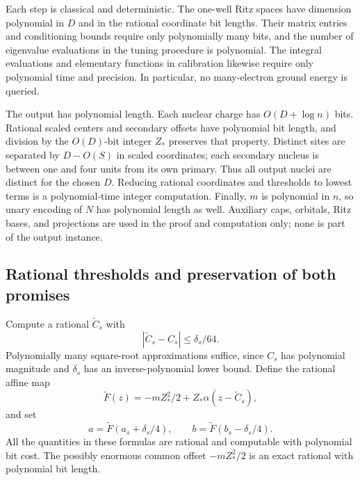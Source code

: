 Each step is classical and deterministic. The one-well Ritz spaces have dimension polynomial in $D$ and in the rational coordinate bit lengths. Their matrix entries and conditioning bounds require only polynomially many bits, and the number of eigenvalue evaluations in the tuning procedure is polynomial. The integral evaluations and elementary functions in calibration likewise require only polynomial time and precision. In particular, no many-electron ground energy is queried.

The output has polynomial length. Each nuclear charge has $O(D+\log n)$ bits. Rational scaled centers and secondary offsets have polynomial bit length, and division by the $O(D)$-bit integer $Z_*$ preserves that property. Distinct sites are separated by $D-O(S)$ in scaled coordinates; each secondary nucleus is between one and four units from its own primary. Thus all output nuclei are distinct for the chosen $D$. Reducing rational coordinates and thresholds to lowest terms is a polynomial-time integer computation. Finally, $m$ is polynomial in $n$, so unary encoding of $N$ has polynomial length as well. Auxiliary caps, orbitals, Ritz bases, and projections are used in the proof and computation only; none is part of the output instance.

\subsection{Rational thresholds and preservation of both promises}

Compute a rational $\widetilde C_s$ with
\begin{equation}\label{eq:scalar-precision}
|\widetilde C_s-C_s|\le\delta_s/64.
\end{equation}
Polynomially many square-root approximations suffice, since $C_s$ has polynomial magnitude and $\delta_s$ has an inverse-polynomial lower bound. Define the rational affine map
\begin{equation}\label{eq:affine-map}
\widetilde F(z)=-mZ_*^2/2+Z_*\alpha(z-\widetilde C_s),
\end{equation}
and set
\begin{equation}\label{eq:output-thresholds}
a=\widetilde F(a_s+\delta_s/4),
\qquad b=\widetilde F(b_s-\delta_s/4).
\end{equation}
All the quantities in these formulas are rational and computable with polynomial bit cost. The possibly enormous common offset $-mZ_*^2/2$ is an exact rational with polynomial bit length.

